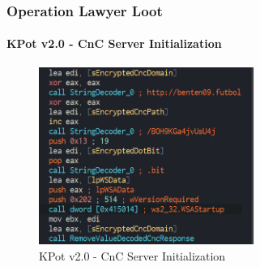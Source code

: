\documentclass[aspectratio=169]{beamer}
\begin{document}
{
\begin{frame}
  \frametitle{Operation Lawyer Loot}
  \framesubtitle{KPot v2.0 - CnC Server Initialization}
  \begin{figure}
    \includegraphics[width=7cm]{kpot-cnc-init-server}
    \caption{KPot v2.0 - CnC Server Initialization}
  \end{figure}
\end{frame}
}
\end{document}
